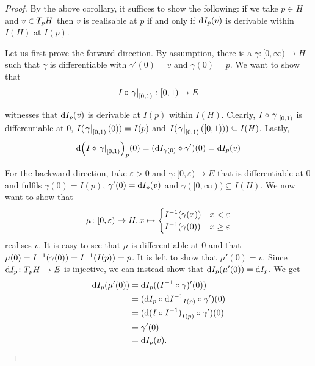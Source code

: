 \begin{proof}
By the above corollary, it suffices to show the following: if we take $p \in H$ and $v \in T_{p}H$ then $v$ is realisable at $p$ if and only if $\text{d}{I}_{p}(v)$ is derivable within $I(H)$ at $I(p)$. 

Let us first prove the forward direction. By assumption, there is a $\gamma \colon [0, \infty) \to H$ such that $\gamma$ is differentiable with $\gamma'(0) = v$ and $\gamma (0) = p$. We want to show that
\begin{equation*}
I \circ \left.\gamma\right|_{[0, 1)} \colon [0, 1) \to E
\end{equation*}

witnesses that $\text{d}{I}_{p}(v)$ is derivable at $I(p)$ within $I(H)$. 
Clearly, $I \circ \left.\gamma\right|_{[0, 1)}$ is differentiable at $0$, $I (\left.\gamma\right|_{[0, 1)}(0)) = I(p)$ and $I(\left.\gamma\right|_{[0, 1)}([0, 1))) \subseteq I(H)$. 
Lastly, 
\begin{equation*}
\text{d}{\left(I \circ \ensuremath{\left.\gamma\right|_{[0, 1)}}\right)}_{p}(0) = (\text{d}{I}_{\gamma (0)} \circ \gamma') (0) = \text{d}{I}_{p}(v)
\end{equation*}

For the backward direction, take $\varepsilon > 0$ and $\gamma \colon [0, \varepsilon) \to E$ that is differentiable at $0$ and fulfils $\gamma (0) = I(p)$, $\gamma' (0) = \text{d}{I}_{p}(v)$ and $\gamma([0, \infty)) \subseteq I(H)$. 
We now want to show that
\begin{equation*}
\mu \colon [0, \varepsilon) \to H, x \mapsto \begin{cases}
    I^{-1}(\gamma (x)) & x < \varepsilon \\
    I^{-1}(\gamma (0)) & x \ge \varepsilon \\
\end{cases} 
\end{equation*}
realises $v$. 
It is easy to see that $\mu$ is differentiable at $0$ and that $\mu (0) = I^{-1}(\gamma (0)) = I^{-1}(I(p)) = p$. 
It is left to show that $\mu'(0) = v$. Since $\text{d}{I}_{p} \colon T_{p}H \to E$ is injective, we can instead show that $\text{d}{I}_{p}(\mu' (0)) = \text{d}{I}_{p}$. 
We get
\begin{equation*}
\begin{split}
\text{d}{I}_{p}(\mu' (0)) &= \text{d}{I}_{p}((I^{-1} \circ \gamma)' (0)) \\
&= (\text{d}{I}_{p} \circ \text{d}{I^{-1}}_{I(p)} \circ \gamma') (0) \\
& = (\text{d}{(I \circ I^{-1})}_{I(p)} \circ \gamma') (0) \\
& = \gamma' (0) \\
& = \text{d}{I}_{p}(v).
\end{split}
\end{equation*}
\end{proof}

